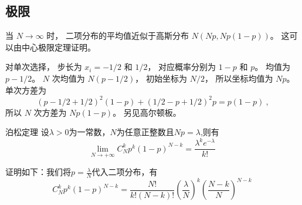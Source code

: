 \subsection{极限}
当 $N\to\infty$ 时， 二项分布的平均值近似于高斯分布 $N(Np, Np(1-p))$。 这可以由中心极限定理证明。


对单次选择， 步长为 $x_i = -1/2$ 和 $1/2$， 对应概率分别为 $1-p$ 和 $p$。 均值为 $p - 1/2$。 $N$ 次均值为 $N(p - 1/2)$， 初始坐标为 $N/2$， 所以坐标均值为 $Np$。 单次方差为
\begin{equation}
(p-1/2+1/2)^2(1-p) + (1/2 - p + 1/2)^2 p = p(1-p)~,
\end{equation}
所以 $N$ 次方差为 $Np(1-p)$。 另见高尔顿板。

\begin{theorem}{泊松定理}
设$\lambda>0$为一常数，$N$为任意正整数且$Np=\lambda$,则有
\begin{equation}
\lim_{N\to +\infty} C_N^k p^k(1-p)^{N-k} = \frac{\lambda^k e^{-\lambda}}{k!}~
\end{equation}
\end{theorem}
证明如下：我们将$p=\frac{\lambda}{N}$代入二项分布，有
\begin{equation}
C_N^k p^k(1-p)^{N-k} = \frac{N!}{k! (N-k)!} (\frac{\lambda}{N})^k (\frac{N-k}{N})^{N-k}~
\end{equation}
